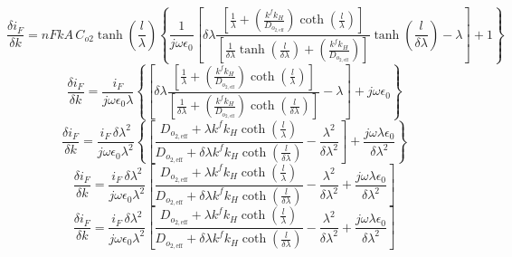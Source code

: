 \documentclass[Notes.tex]{subfiles}
\begin{document}
\begin{equation}
	\frac{\delta i_F}{\delta k} = nFkA\,C_{o2}\tanh{\left(\frac{l}{\lambda}\right)} \left\{\frac{1}{j\omega\epsilon_0}\left[\delta\lambda \frac{\left[\frac{1}{\lambda}  + \left(\frac{k^f k_H} {D_{o_{2,\textrm{eff}}}}\right)\coth{\left(\frac{l}{\lambda}\right)} \right]}{\left[ \frac{1} {\delta\lambda} \tanh{\left(\frac{l}{\delta\lambda}\right)} + \left(\frac{k^f k_H} {D_{o_{2,\textrm{eff}}}}\right) \right]} \tanh{\left(\frac{l}{\delta\lambda}\right)} - {\lambda} \right] + 1 \right\}\nonumber
\end{equation}
\begin{equation}
	\frac{\delta i_F}{\delta k} = \frac{i_F}{j\omega\epsilon_0\lambda} \left\{ \left[\delta\lambda \frac{\left[\frac{1}{\lambda}  + \left(\frac{k^f k_H} {D_{o_{2,\textrm{eff}}}}\right)\coth{\left(\frac{l}{\lambda}\right)} \right]}{\left[ \frac{1} {\delta\lambda} + \left(\frac{k^f k_H} {D_{o_{2,\textrm{eff}}}}\right) \coth{\left(\frac{l}{\delta\lambda}\right)}\right]} - {\lambda} \right] + j\omega\epsilon_0 \right\}\nonumber
\end{equation}
\begin{equation}
	\frac{\delta i_F}{\delta k} = \frac{i_F\,\delta\lambda^2}{j\omega\epsilon_0\lambda^2}	 \left\{\left[ \frac{D_{o_{2,\textrm{eff}}} + \lambda k^f k_H\coth{\left(\frac{l}{\lambda}\right)} } {D_{o_{2,\textrm{eff}}} + \delta\lambda k^f k_H \coth{\left(\frac{l}{\delta\lambda}\right)}} - \frac{\lambda^2}{\delta\lambda^2} \right] + \frac{j\omega\lambda\epsilon_0}{\delta\lambda^2} \right\}\nonumber
\end{equation}
\begin{equation}
	\frac{\delta i_F}{\delta k} = \frac{i_F\,\delta\lambda^2}{j\omega\epsilon_0\lambda^2}	 \left[\frac{D_{o_{2,\textrm{eff}}} + \lambda k^f k_H\coth{\left(\frac{l}{\lambda}\right)}}	 {D_{o_{2,\textrm{eff}}} + \delta\lambda k^f k_H \coth{\left(\frac{l}{\delta\lambda}\right)}} - \frac{\lambda^2}{\delta\lambda^2} + \frac{j\omega\lambda\epsilon_0}{\delta\lambda^2} \right]\nonumber
\end{equation}
\begin{equation}
\frac{\delta i_F}{\delta k} = \frac{i_F\,\delta\lambda^2}{j\omega\epsilon_0\lambda^2}	 \left[\frac{D_{o_{2,\textrm{eff}}} + \lambda k^f k_H\coth{\left(\frac{l}{\lambda}\right)}}	 {D_{o_{2,\textrm{eff}}} + \delta\lambda k^f k_H \coth{\left(\frac{l}{\delta\lambda}\right)}} - \frac{\lambda^2}{\delta\lambda^2} + \frac{j\omega\lambda\epsilon_0}{\delta\lambda^2} \right]\nonumber
\end{equation}
\end{document}
